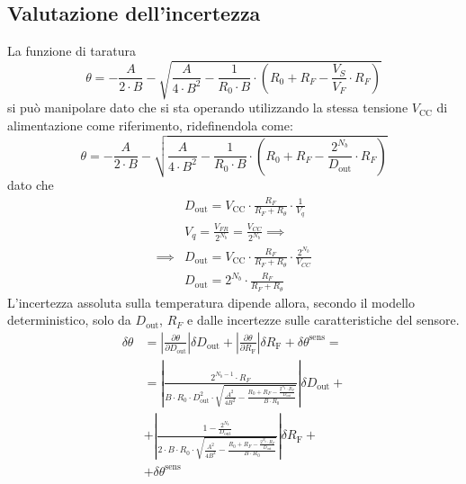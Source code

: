 \documentclass{article}
\begin{document}
\subsection{Valutazione dell'incertezza}
La funzione di taratura
\begin{equation*}
    \theta=-\frac{A}{2\cdot B} - \sqrt{\frac{A}{4\cdot B^2} - \frac{1}{R_0\cdot B}\cdot\left(R_0+R_F-\frac{V_S}{V_F}\cdot R_F\right)}
\end{equation*}
si può manipolare dato che si sta operando utilizzando la stessa tensione $V_{\text{CC}}$ di alimentazione come riferimento, ridefinendola come:
\begin{equation*}
    \theta=-\frac{A}{2\cdot B} - \sqrt{\frac{A}{4\cdot B^2} - \frac{1}{R_0\cdot B}\cdot\left(R_0+R_F-\frac{2^{N_b}}{D_\text{out}}\cdot R_F\right)}
\end{equation*}
dato che 
\begin{equation*}
    \begin{split}
        &D_{\text{out}} = V_{\text{CC}} \cdot \frac{R_F}{R_F + R_{\theta}}\cdot\frac{1}{V_{q}}\\
        &V_q = \frac{V_{FR}}{2^{N_b}}=\frac{V_{CC}}{2^{N_b}} \implies \\
        \implies&D_{\text{out}} = V_{\text{CC}} \cdot \frac{R_F}{R_F + R_{\theta}}\cdot\frac{2^{N_b}}{V_{CC}}\\
        &D_{\text{out}} = 2^{N_b} \cdot \frac{R_F}{R_F + R_{\theta}}
    \end{split}
\end{equation*}
L'incertezza assoluta sulla temperatura dipende allora, secondo il modello deterministico, solo da $D_{\text{out}}$, $R_F$ e dalle incertezze sulle caratteristiche del sensore.
\begin{equation*}
    \begin{split}
        \delta\theta&=\left|\frac{\partial{\theta}}{\partial{D_\text{out}}}\right|\delta D_\text{out}+\left|\frac{\partial{\theta}}{\partial{R_\text{F}}}\right|\delta R_\text{F}+\delta \theta^\text{sens}=\\
        &=\left|\frac{2^{N_b-1}\cdot R_F}{B\cdot R_0\cdot D_\text{out}^2\cdot\sqrt{\frac{A^2}{4B^2}-\frac{R_0+R_F-\frac{2^{N_b}\cdot R_F}{D_\text{out}}}{B\cdot R_0}}}\right|\delta D_\text{out}+\\
        &+\left|\frac{1-\frac{2^{N_b}}{D_\text{out}}}{2\cdot B\cdot R_0 \cdot \sqrt{\frac{A^2}{4B^2}-\frac{R_0+R_F-\frac{2^{N_b}\cdot R_F}{D_\text{out}}}{B\cdot R_0}}}\right|\delta R_\text{F}+\\
        &+\delta \theta^\text{sens}
    \end{split}
\end{equation*}
\end{document}
